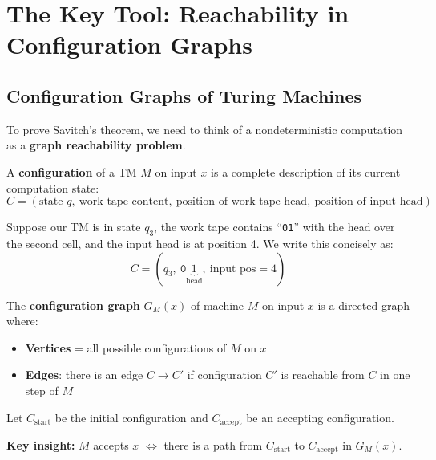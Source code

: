 \documentclass[12pt,a4paper]{article}
\theoremstyle{plain}
\theoremstyle{definition}
\theoremstyle{remark}
\begin{document}
\section{The Key Tool: Reachability in Configuration Graphs}

\subsection{Configuration Graphs of Turing Machines}

To prove Savitch's theorem, we need to think of a nondeterministic computation as a \textbf{graph reachability problem}.

\begin{definitionbox}
A \textbf{configuration} of a TM $M$ on input $x$ is a complete description of its current computation state:
\[
  C = (\text{state } q,\ \text{work-tape content},\ \text{position of work-tape head},\ \text{position of input head})
\]
\end{definitionbox}

\begin{examplebox}
Suppose our TM is in state $q_3$, the work tape contains ``\texttt{01}'' with the head over the second cell, and the input head is at position 4. We write this concisely as:
\[
  C = (q_3,\ \texttt{0}\underbrace{1}_{\text{head}},\ \text{input pos}=4)
\]
\end{examplebox}

\begin{definitionbox}
The \textbf{configuration graph} $G_M(x)$ of machine $M$ on input $x$ is a directed graph where:
\begin{itemize}
  \item \textbf{Vertices} = all possible configurations of $M$ on $x$
  \item \textbf{Edges}: there is an edge $C \to C'$ if configuration $C'$ is reachable from $C$ in one step of $M$
\end{itemize}
Let $C_{\text{start}}$ be the initial configuration and $C_{\text{accept}}$ be an accepting configuration.

\medskip
\textbf{Key insight:} $M$ accepts $x$ $\iff$ there is a path from $C_{\text{start}}$ to $C_{\text{accept}}$ in $G_M(x)$.
\end{definitionbox}
\end{document}
